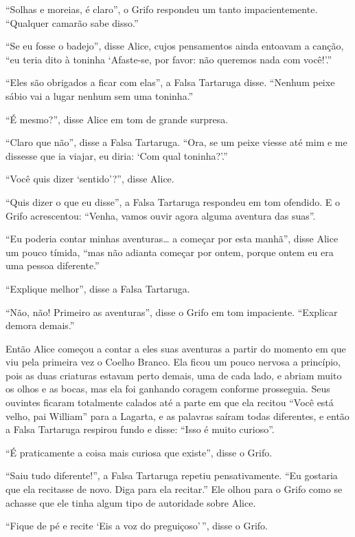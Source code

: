 ``Solhas e moreias, é claro'', o Grifo respondeu um tanto
impacientemente. ``Qualquer camarão sabe disso.''

``Se eu fosse o badejo'', disse Alice, cujos pensamentos ainda entoavam
a canção, ``eu teria dito à toninha `Afaste-se, por favor: não queremos
nada com você!'.''

``Eles são obrigados a ficar com elas'', a Falsa Tartaruga disse.
``Nenhum peixe sábio vai a lugar nenhum sem uma toninha.''

``É mesmo?'', disse Alice em tom de grande surpresa.

``Claro que não'', disse a Falsa Tartaruga. ``Ora, se um peixe viesse
até mim e me dissesse que ia viajar, eu diria: `Com qual toninha?'.''

``Você quis dizer `sentido'?'', disse Alice.

``Quis dizer o que eu disse'', a Falsa Tartaruga respondeu em tom
ofendido. E o Grifo acrescentou: ``Venha, vamos ouvir agora alguma
aventura das suas''.

``Eu poderia contar minhas aventuras\ldots{} a começar por esta manhã'',
disse Alice um pouco tímida, ``mas não adianta começar por ontem, porque
ontem eu era uma pessoa diferente.''

``Explique melhor'', disse a Falsa Tartaruga.

``Não, não! Primeiro as aventuras'', disse o Grifo em tom impaciente.
``Explicar demora demais.''

Então Alice começou a contar a eles suas aventuras a partir do momento em
que viu pela primeira vez o Coelho Branco. Ela ficou um pouco nervosa a
princípio, pois as duas criaturas estavam perto demais, uma de cada lado,
e abriam muito os olhos e as bocas, mas ela foi ganhando coragem
conforme prosseguia. Seus ouvintes ficaram totalmente calados até a
parte em que ela recitou ``Você está velho, pai William'' para a
Lagarta, e as palavras saíram todas diferentes, e então a Falsa
Tartaruga respirou fundo e disse: ``Isso é muito curioso''.

``É praticamente a coisa mais curiosa que existe'', disse o Grifo.

``Saiu tudo diferente!'', a Falsa Tartaruga repetiu pensativamente. ``Eu
gostaria que ela recitasse de novo. Diga para ela recitar.'' Ele olhou
para o Grifo como se achasse que ele tinha algum tipo de autoridade
sobre Alice.

``Fique de pé e recite `Eis a voz do preguiçoso'\,'', disse o Grifo.

